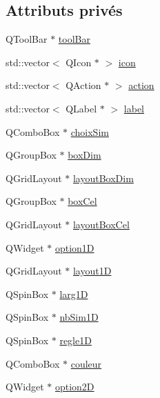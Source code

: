 \subsection*{Attributs privés}
\begin{DoxyCompactItemize}
\item 
Q\+Tool\+Bar $\ast$ \hyperlink{class_main_window_a10d2a8149dc4da0a7df5ee9e4e189721}{tool\+Bar}
\item 
std\+::vector$<$ Q\+Icon $\ast$ $>$ \hyperlink{class_main_window_ab903c7e6c6310d5ae1455d5935ec446a}{icon}
\item 
std\+::vector$<$ Q\+Action $\ast$ $>$ \hyperlink{class_main_window_a03fc8c2845f51b55f2b733c9ad66a0c8}{action}
\item 
std\+::vector$<$ Q\+Label $\ast$ $>$ \hyperlink{class_main_window_a4d2abb2a3dc6e601f8ed99ec58879f79}{label}
\item 
Q\+Combo\+Box $\ast$ \hyperlink{class_main_window_a11ee55d02a2bccaf673267f930bc0f90}{choix\+Sim}
\item 
Q\+Group\+Box $\ast$ \hyperlink{class_main_window_a69406bb359d08dd42c0a05957ae89b51}{box\+Dim}
\item 
Q\+Grid\+Layout $\ast$ \hyperlink{class_main_window_a1827baeeedb3477f4fd4c705aedda5c1}{layout\+Box\+Dim}
\item 
Q\+Group\+Box $\ast$ \hyperlink{class_main_window_ac7c010cdcd4cafe4a9ac0b87ad384b8a}{box\+Cel}
\item 
Q\+Grid\+Layout $\ast$ \hyperlink{class_main_window_accffbd02cf5f6e812592410d90a2bf01}{layout\+Box\+Cel}
\item 
Q\+Widget $\ast$ \hyperlink{class_main_window_a676e5f857b1b37f685cce4d1b53e221c}{option1D}
\item 
Q\+Grid\+Layout $\ast$ \hyperlink{class_main_window_a25605b8d3fa4ec4b5cef93bb266136e7}{layout1D}
\item 
Q\+Spin\+Box $\ast$ \hyperlink{class_main_window_a8ea57e6e7e57cbe0e03ebb75a385439a}{larg1D}
\item 
Q\+Spin\+Box $\ast$ \hyperlink{class_main_window_adf5c1f107d4ba21b762ddde7c9284f57}{nb\+Sim1D}
\item 
Q\+Spin\+Box $\ast$ \hyperlink{class_main_window_ad652e5a8e2bbf95af39779853bab4142}{regle1D}
\item 
Q\+Combo\+Box $\ast$ \hyperlink{class_main_window_aae0246fdb4536b62a90c2fd39fef98ab}{couleur}
\item 
Q\+Widget $\ast$ \hyperlink{class_main_window_abe71dc980ca6f6a52d5d0f9bf0902dff}{option2D}
\item 

\end{DoxyCompactItemize}

